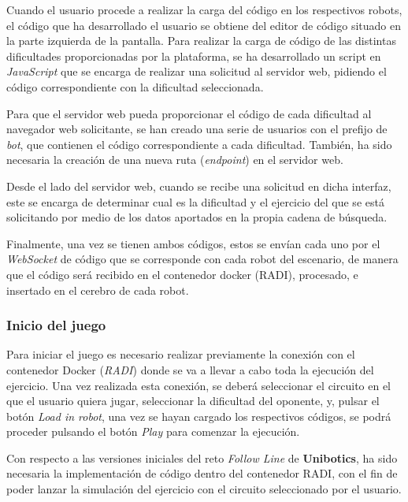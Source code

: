 \documentclass[a4paper, 12pt]{book}
\begin{document}
Cuando el usuario procede a realizar la carga del código en los respectivos robots, el código que ha desarrollado el usuario
se obtiene del editor de código situado en la parte izquierda de la pantalla. Para realizar la carga de código de las distintas dificultades proporcionadas por la plataforma, se ha desarrollado un script en \emph{JavaScript} que se encarga de realizar una solicitud al servidor web, pidiendo el código correspondiente con la dificultad seleccionada.

Para que el servidor web pueda proporcionar el código de cada dificultad al navegador web solicitante, se han creado una serie de usuarios con el prefijo de \emph{bot}, que contienen el código correspondiente a cada dificultad. También, ha sido necesaria la creación de una nueva ruta (\emph{endpoint}) en el servidor web.

Desde el lado del servidor web, cuando se recibe una solicitud en dicha interfaz, este se encarga de determinar cual es la dificultad y el ejercicio del que se está solicitando por medio de los datos aportados en la propia cadena de búsqueda.

Finalmente, una vez se tienen ambos códigos, estos se envían cada uno por el \emph{WebSocket} de código que se corresponde con cada robot del escenario, de manera que el código será recibido en el contenedor docker (RADI), procesado, e insertado en el cerebro de cada robot. 

\subsubsection{Inicio del juego}
\label{subsec:follow_line_game_inicio}

Para iniciar el juego es necesario realizar previamente la conexión con el contenedor Docker (\emph{RADI}) donde se va a llevar a cabo toda la ejecución del ejercicio. Una vez realizada esta conexión, se deberá seleccionar el circuito en el que el usuario quiera jugar, seleccionar la dificultad del oponente, y, pulsar el botón \emph{Load in robot}, una vez se hayan cargado los respectivos códigos, se podrá proceder pulsando el botón \emph{Play} para comenzar la ejecución.

Con respecto a las versiones iniciales del reto \emph{Follow Line} de \textbf{Unibotics}, ha sido necesaria la implementación de código dentro del contenedor RADI, con el fin de poder lanzar la simulación del ejercicio con el circuito seleccionado por el usuario.
\end{document}
